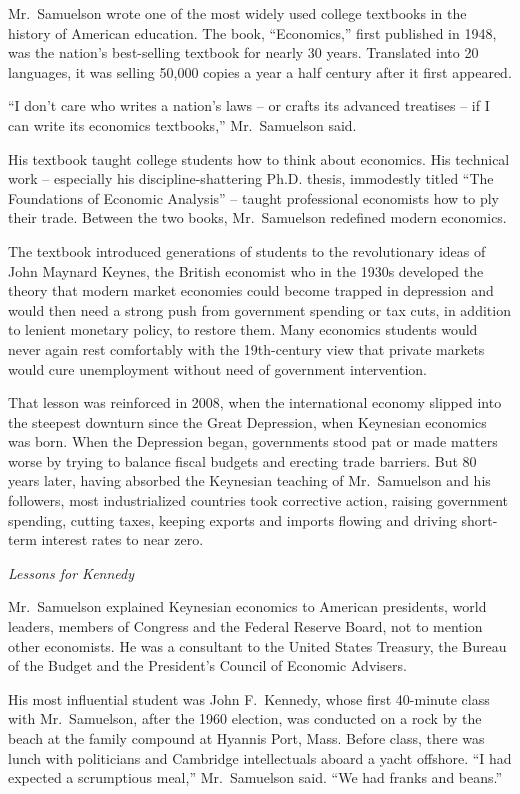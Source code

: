 ﻿\documentclass[12pt]{article}
\begin{document}
Mr.~Samuelson wrote one of the most widely used college textbooks in the history of American
education. The book, ``Economics,'' first published in 1948, was the nation's best-selling textbook
for nearly 30 years. Translated into 20 languages, it was selling 50,000 copies a year a half
century after it first appeared.

``I don't care who writes a nation's laws -- or crafts its advanced treatises -- if I can write its
economics textbooks,'' Mr.~Samuelson said.

His textbook taught college students how to think about economics. His technical work -- especially
his discipline-shattering Ph.D. thesis, immodestly titled ``The Foundations of Economic Analysis''
-- taught professional economists how to ply their trade. Between the two books, Mr.~Samuelson
redefined modern economics.

The textbook introduced generations of students to the revolutionary ideas of John Maynard Keynes,
the British economist who in the 1930s developed the theory that modern market economies could
become trapped in depression and would then need a strong push from government spending or tax cuts,
in addition to lenient monetary policy, to restore them. Many economics students would never again
rest comfortably with the 19th-century view that private markets would cure unemployment without
need of government intervention.

That lesson was reinforced in 2008, when the international economy slipped into the steepest
downturn since the Great Depression, when Keynesian economics was born. When the Depression began,
governments stood pat or made matters worse by trying to balance fiscal budgets and erecting trade
barriers. But 80 years later, having absorbed the Keynesian teaching of Mr.~Samuelson and his
followers, most industrialized countries took corrective action, raising government spending,
cutting taxes, keeping exports and imports flowing and driving short-term interest rates to near
zero.

\emph{Lessons for Kennedy}

Mr.~Samuelson explained Keynesian economics to American presidents, world leaders, members of
Congress and the Federal Reserve Board, not to mention other economists. He was a consultant to the
United States Treasury, the Bureau of the Budget and the President's Council of Economic Advisers.

His most influential student was John F.~Kennedy, whose first 40-minute class with Mr.~Samuelson,
after the 1960 election, was conducted on a rock by the beach at the family compound at Hyannis
Port, Mass. Before class, there was lunch with politicians and Cambridge intellectuals aboard a
yacht offshore. ``I had expected a scrumptious meal,'' Mr.~Samuelson said. ``We had franks and
beans.''
\end{document}
